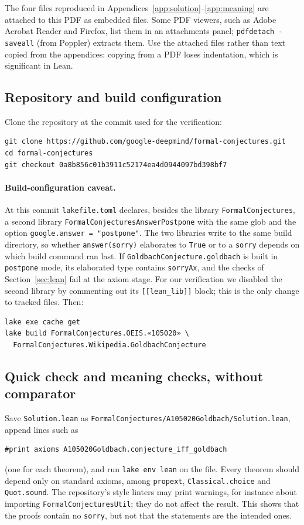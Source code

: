 \documentclass[11pt,a4paper]{article}
\newcommand{\li}{\lstinline[style=inline]}
\theoremstyle{plain}
\theoremstyle{remark}
\begin{document}
{The four files reproduced in Appendices~\ref{app:solution}--\ref{app:meaning} are
attached to this PDF as embedded files. Some PDF viewers, such as Adobe Acrobat Reader
and Firefox, list them in an attachments panel; \mbox{\texttt{pdfdetach -saveall}} (from
Poppler) extracts them. Use the attached files rather than text copied from the
appendices: copying from a PDF loses indentation, which is significant in Lean.

\subsection{Repository and build configuration}

Clone the repository at the commit used for the verification:
\begin{lstlisting}
git clone https://github.com/google-deepmind/formal-conjectures.git
cd formal-conjectures
git checkout 0a8b856c01b3911c52174ea4d0944097bd398bf7
\end{lstlisting}

\paragraph{Build-configuration caveat.}
At this commit \texttt{lakefile.toml} declares, besides the library
\texttt{FormalConjectures}, a second library \texttt{FormalConjecturesAnswerPostpone}
with the same glob and the option \li{google.answer = "postpone"}. The two libraries
write to the same build directory, so whether \li{answer(sorry)} elaborates to
\li{True} or to a \li{sorry} depends on which build command ran last. If
\li{GoldbachConjecture.goldbach} is built in \texttt{postpone} mode, its elaborated
type contains \li{sorryAx}, and the checks of Section~\ref{sec:lean} fail at the axiom
stage. For our verification we disabled the second library by commenting out its
\texttt{[[lean\_lib]]} block; this is the only change to tracked files. Then:
\begin{lstlisting}
lake exe cache get
lake build FormalConjectures.OEIS.«105020» \
  FormalConjectures.Wikipedia.GoldbachConjecture
\end{lstlisting}

\subsection{Quick check and meaning checks, without comparator}

Save \texttt{Solution.lean} as
\nolinkurl{FormalConjectures/A105020Goldbach/Solution.lean}, append lines such as
\begin{lstlisting}
#print axioms A105020Goldbach.conjecture_iff_goldbach
\end{lstlisting}
(one for each theorem), and run \texttt{lake env lean} on the file. Every theorem should
depend only on standard axioms, among \li{propext}, \li{Classical.choice} and
\li{Quot.sound}. The repository's style linters may print warnings, for instance about
importing \texttt{FormalConjecturesUtil}; they do not affect the result. This shows
that the proofs contain no \li{sorry}, but not that the statements are the intended
ones.

}
\end{document}
